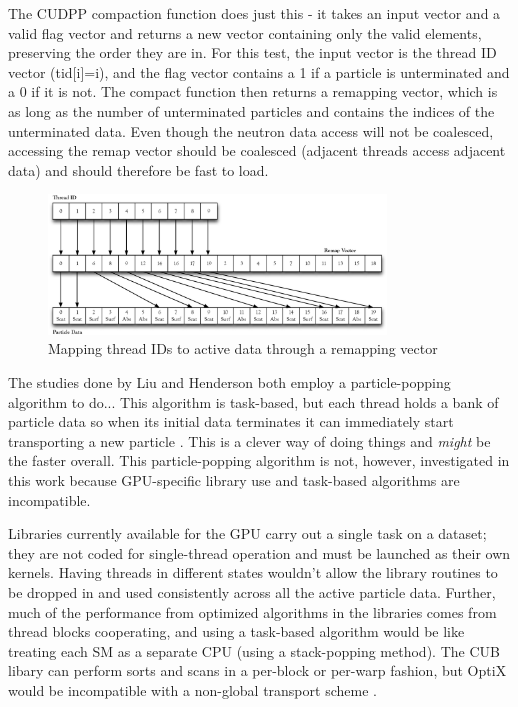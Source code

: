 The CUDPP compaction function does just this - it takes an input vector and a valid flag vector and returns a new vector containing only the valid elements, preserving the order they are in.  For this test, the input vector is the thread ID vector (tid[i]=i), and the flag vector contains a 1 if a particle is unterminated and a 0 if it is not.  The compact function then returns a remapping vector, which is as long as the number of unterminated particles and contains the indices of the unterminated data.  Even though the neutron data access will not be coalesced, accessing the remap vector should be coalesced (adjacent threads access adjacent data) and should therefore be fast to load.

\begin{figure}[h!] 
  \centering
    \includegraphics[width=0.8\textwidth]{graphics/remapping_horiz.eps}
     \caption{Mapping thread IDs to active data through a remapping vector \label{remapping} }
\end{figure}

The studies done by Liu and Henderson both employ a particle-popping algorithm to do...  %
This algorithm is task-based, but each thread holds a bank of particle data so when its initial data terminates it can immediately start transporting a new particle \cite{tianyu, henderson, qixu}.  This is a clever way of doing things and \emph{might} be the faster overall. This particle-popping algorithm is not, however, investigated in this work because GPU-specific library use and task-based algorithms are incompatible. 

Libraries currently available for the GPU carry out a single task on a dataset; they are not coded for single-thread operation and must be launched as their own kernels.  Having threads in different states wouldn't allow the library routines to be dropped in and used consistently across all the active particle data.  Further, much of the performance from optimized algorithms in the libraries comes from thread blocks cooperating, and using a task-based algorithm would be like treating each SM as a separate CPU (using a stack-popping method).  The CUB libary can perform sorts and scans in a per-block or per-warp fashion, but OptiX would be incompatible with a non-global transport scheme \cite{optix}.

